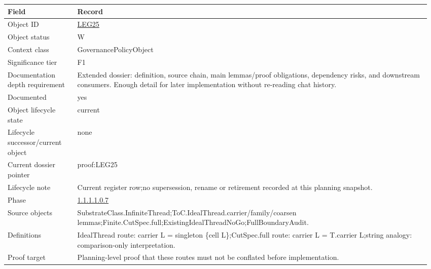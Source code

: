 \begin{longtable}{L{0.16\linewidth} L{0.81\linewidth}}
\hline
\textbf{Field} & \textbf{Record}\\
\hline
Object ID & \hyperlink{object-row-LEG25}{LEG25}\\
\hline\addlinespace[0.20em]
Object status & W\\
\hline\addlinespace[0.20em]
Context class & GovernancePolicyObject\\
\hline\addlinespace[0.20em]
Significance tier & F1\\
\hline\addlinespace[0.20em]
Documentation depth requirement & Extended dossier: definition, source chain, main lemmas/\allowbreak{}proof obligations, dependency risks, and downstream consumers. Enough detail for later implementation without re-reading chat history.\\
\hline\addlinespace[0.20em]
Documented & yes\\
\hline\addlinespace[0.20em]
Object lifecycle state & current\\
\hline\addlinespace[0.20em]
Lifecycle successor/\allowbreak{}current object & none\\
\hline\addlinespace[0.20em]
Current dossier pointer & proof:LEG25\\
\hline\addlinespace[0.20em]
Lifecycle note & Current register row;\newline no supersession, rename or retirement recorded at this planning snapshot.\\
\hline\addlinespace[0.20em]
Phase & \hyperlink{phase-row-1-1-1-1-0-7}{1.1.1.1.0.7}\\
\hline\addlinespace[0.20em]
Source objects & SubstrateClass.InfiniteThread;\newline ToC.IdealThread.carrier/\allowbreak{}family/\allowbreak{}coarsen lemmas;\newline Finite.CutSpec.full;\newline ExistingIdealThreadNoGo;\newline FullBoundaryAudit.\\
\hline\addlinespace[0.20em]
Definitions & IdealThread route: carrier L = singleton \{cell L\};\newline CutSpec.full route: carrier L = T.carrier L;\newline string analogy: comparison-only interpretation.\\
\hline\addlinespace[0.20em]
Proof target & Planning-level proof that these routes must not be conflated before implementation.\\

\end{longtable}
